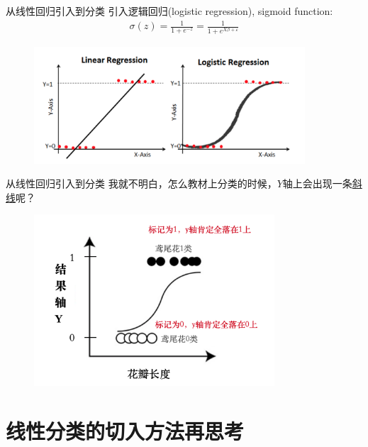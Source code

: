 \documentclass[handout]{ctexbeamer}
\begin{document}
\begin{frame}{从线性回归引入到分类}
引入逻辑回归(logistic regression), sigmoid function:
	\begin{align*}
		\sigma(z) = \frac{1}{1+e^{-z}} = \frac{1}{1+e^{X\beta + \varepsilon}}
	\end{align*}
	\begin{figure}[H]
		\centering
		\includegraphics[width=0.9\textwidth]{fig/logisticreg3}
	\end{figure}
\end{frame}


\begin{frame}{从线性回归引入到分类}
我就不明白，怎么教材上分类的时候，$Y$轴上会出现一条\underline{斜线}呢？
\begin{figure}
	\centering
	\includegraphics[width=0.8\textwidth]{fig/logisticreg4}
\end{figure}	
\end{frame}



\section{线性分类的切入方法再思考}
\end{document}
